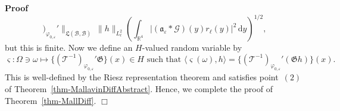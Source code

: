 \documentclass{article}
\newcommand{\mathd}{\mathrm{d}}
\newenvironment{proof}{\noindent\textbf{Proof\ }}{\hspace*{\fill}$\Box$\medskip}
\begin{document}
\begin{proof}
\[       )_{\varphi_{0, \varepsilon}}' \|_{\mathfrak{L} (\mathcal{B},       \mathcal{B})}  ~ \| h \|_{L^2_{\ell}} \left(
       \int_{\mathbb{R}^4} | (\mathfrak{a}_{\varepsilon} \ast \mathcal{G}) (y)
       r_{\ell}(y) |^2 \, \mathd y \right)^{1 / 2},
     \]
  but this is finite. Now we define an $H$-valued random variable by
  \[ \varsigma : \Omega \ni \omega \mapsto \{ (\mathcal{T}^{- 1}
     )_{\varphi_{0, \varepsilon}}' \mathfrak{G} \} (x) \in H \textrm{ such that } \langle \varsigma (\omega), h \rangle = \{ (\mathcal{T}^{- 1}
     )_{\varphi_{0, \varepsilon}}' (\mathfrak{G}h) \} (x) . \]
  This is well-defined by the Riesz representation theorem and satisfies point~$(2)$ of Theorem~\ref{thm-MallavinDiffAbstract}. Hence, we complete
  the proof of Theorem~\ref{thm-MallDiff}.
\end{proof}
\end{document}
